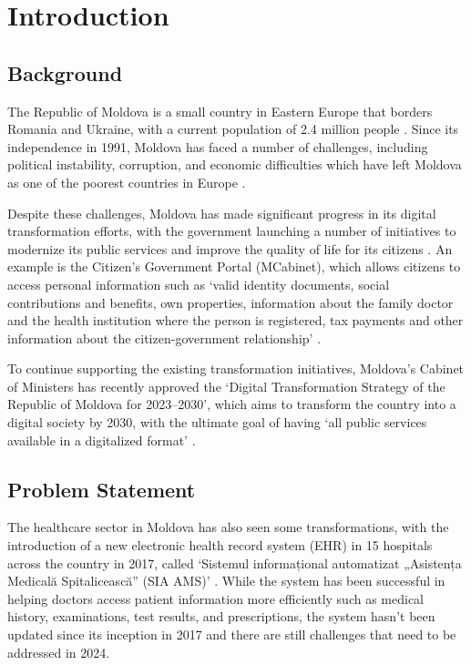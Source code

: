 \chapter{Introduction}\label{chap:introduction}

\section{Background}

The Republic of Moldova is a small country in Eastern Europe that borders Romania and Ukraine, with a current population of 2.4 million people \parencite{mdpop}. Since its independence in 1991, Moldova has faced a number of challenges, including political instability, corruption, and economic difficulties which have left Moldova as one of the poorest countries in Europe \parencite{mdpoverty}. 

Despite these challenges, Moldova has made significant progress in its digital transformation efforts, with the government launching a number of initiatives to modernize its public services and improve the quality of life for its citizens \parencite{mdega}. An example is the Citizen's Government Portal (MCabinet), which allows citizens to access personal information such as `valid identity documents, social contributions and benefits, own properties, information about the family doctor and the health institution where the person is registered, tax payments and other information about the citizen-government relationship' \parencite{mdcabinet}. 

To continue supporting the existing transformation initiatives, Moldova's Cabinet of Ministers has recently approved the `Digital Transformation Strategy of the Republic of Moldova for 2023--2030', which aims to transform the country into a digital society by 2030, with the ultimate goal of having `all public services available in a digitalized format' \parencite{mdstrategy}.

\section{Problem Statement}

The healthcare sector in Moldova has also seen some transformations, with the introduction of a new electronic health record system (EHR) in 15 hospitals across the country in 2017, called `Sistemul informațional automatizat „Asistența Medicală Spitalicească” (SIA AMS)' \parencite{mdehr}. While the system has been successful in helping doctors access patient information more efficiently such as medical history, examinations, test results, and prescriptions, the system hasn't been updated since its inception in 2017 and there are still challenges that need to be addressed in 2024.

